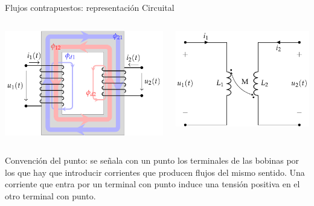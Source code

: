 \documentclass[aspectratio=169, usenames,svgnames,dvipsnames]{beamer}
\begin{document}
\begin{frame}[label={sec:org5da4ca0}]{Flujos contrapuestos: representación Circuital}
\begin{columns}
\begin{column}{0.5\columnwidth}
\begin{center}
\includegraphics[width=.9\linewidth]{../figs/acoplamientoTikz_opuesto.pdf}
\end{center}
\end{column}


\begin{column}{0.5\columnwidth}
\begin{center}
\includegraphics[width=.9\linewidth]{../figs/acoplamiento_circuito_opuesto.pdf}
\end{center}
\end{column}
\end{columns}
\alert{Convención del punto}: se señala con un punto los terminales de las
bobinas por los que hay que introducir corrientes que producen flujos
del mismo sentido. Una corriente que entra por un terminal con punto
induce una tensión positiva en el otro terminal con punto.
\end{frame}
\end{document}
